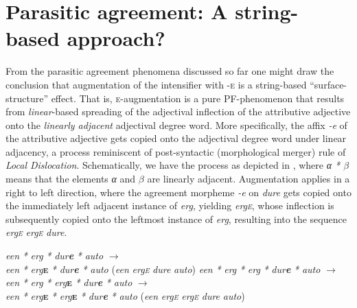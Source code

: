 \documentclass[output=paper]{langsci/langscibook}
\begin{document}
\section{Parasitic agreement: A string-based approach?}\label{sec:key:18.5}

From the parasitic agreement phenomena discussed so far one might draw the
conclusion that augmentation of the intensifier with \textsc{-e} is a
string-based “surface-structure” effect. That is, \textsc{e}-augmentation is a
pure \gls{PF}-phenomenon that results from \emph{linear}-based spreading of the
adjectival inflection of the attributive adjective onto the \emph{linearly
adjacent} adjectival degree word. More specifically, the affix \emph{-e} of the
attributive adjective gets copied onto the adjectival degree word under linear
adjacency, a process reminiscent of 
post-syntactic (morphological merger) rule of \emph{Local Dislocation}.
Schematically, we have the process as depicted in , where
\emph{α * ${\beta}$} means that the elements \emph{α} and \emph{${\beta}$} are
linearly adjacent. Augmentation applies in a right to left direction, where the
agreement morpheme \emph{-e} on \emph{dure} gets copied onto the immediately
left adjacent instance of \emph{erg}, yielding \emph{erg\textsc{e}}, whose
inflection is subsequently copied onto the leftmost instance of \emph{erg},
resulting into the sequence \emph{erg\textsc{e}} \emph{erg\textsc{e}}
\emph{dure}.

\ea%
    \label{ex:key:18.20}
	\ea \emph{een}   \emph{*} \emph{erg}   \emph{*} \emph{dur}\textbf{\emph{e}} \emph{*} \emph{auto}                ${\rightarrow}$ \\
              \emph{een} \emph{*} \emph{erg}\textbf{\textsc{e}} \emph{*}
              \emph{dur}\textbf{\emph{e}} \emph{*} \emph{auto}
              (\emph{een} \emph{erg\textsc{e}} \emph{dure} \emph{auto})
	\ex \emph{een} \emph{*} \emph{erg} \emph{*} \emph{erg} \emph{*} \emph{dur}\textbf{\emph{e}} \emph{*} \emph{auto}      ${\rightarrow}$ \\
              \emph{een} \emph{*} \emph{erg} \emph{*} \emph{erg}\textbf{\textsc{e}} \emph{*} \emph{dur}\textbf{\emph{e}} \emph{*} \emph{auto}    ${\rightarrow}$ \\
              \emph{een} \emph{*} \emph{erg}\textbf{\textsc{e}} \emph{*}
              \emph{erg}\textbf{\textsc{e}} \emph{*}
              \emph{dur}\textbf{\emph{e}} \emph{*} \emph{auto}
              (\emph{een} \emph{erg\textsc{e}} \emph{erg\textsc{e}} \emph{dure}
              \emph{auto})
	\z
\z
\end{document}
